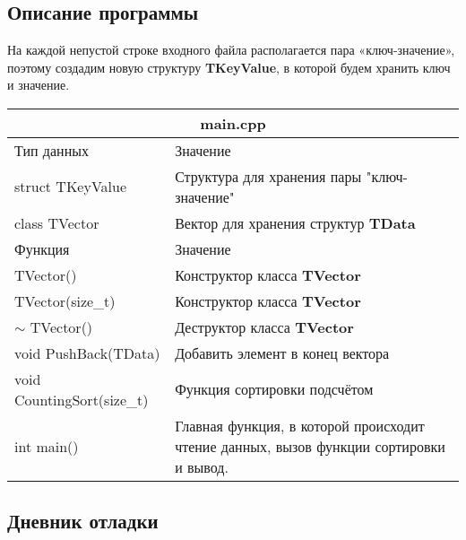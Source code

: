 \documentclass[12pt]{article}
\begin{document}
\subsection*{Описание программы}

На каждой непустой строке входного файла располагается пара «ключ-значение»,
поэтому создадим новую структуру \textbf{TKeyValue}, в которой будем хранить ключ и значение.

\begin{table}[!htb]
\begin{tabular}{|m{8cm}|m{8cm}|}
\hline
\multicolumn{2}{|c|}{main.cpp} \\ 
\hline
\cellcolor{gray!25} Тип данных       & \cellcolor{gray!25} Значение\\ 
\hline
struct TKeyValue & Структура для хранения пары "ключ-значение" \\ 
\hline
class TVector & Вектор для хранения структур \textbf{TData}\\
\hline
\cellcolor{gray!25} Функция & \cellcolor{gray!25}Значение\\
\hline
TVector() & Конструктор класса \textbf{TVector} \\
\hline
TVector(size_t) & Конструктор класса \textbf{TVector} \\
\hline
$\sim$ TVector() & Деструктор класса \textbf{TVector} \\
\hline
void PushBack(TData) & Добавить элемент в конец вектора\\
\hline
void CountingSort(size\_t) & Функция сортировки подсчётом\\
\hline
int main() & Главная функция, в которой происходит чтение данных, вызов функции сортировки и вывод. \\
\hline
\end{tabular}
\end{table}

\newpage

\subsection*{Дневник отладки}
\end{document}
